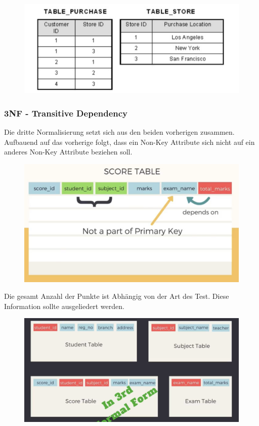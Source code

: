 \begin{figure}[H]
	\centering
	\includegraphics[scale = 0.3]{attachment/chapter_3/Scc037}
	\caption{}
	\label{fig:Scc037}
\end{figure}

\subsubsection{3NF - Transitive Dependency}
Die dritte Normalisierung setzt sich aus den beiden vorherigen zusammen. Aufbauend auf das vorherige folgt, dass ein Non-Key Attribute sich nicht auf ein anderes Non-Key Attribute beziehen soll.

\begin{figure}[H]
	\centering
	\includegraphics[scale = 0.3]{attachment/chapter_3/Scc038}
	\caption{}
	\label{fig:Scc038}
\end{figure}
Die gesamt Anzahl der Punkte ist Abhängig von der Art des Test. Diese Information sollte ausgeliedert werden.


\begin{figure}[H]
	\centering
	\includegraphics[scale = 0.3]{attachment/chapter_3/Scc039}
	\caption{}
	\label{fig:Scc039}
\end{figure}

